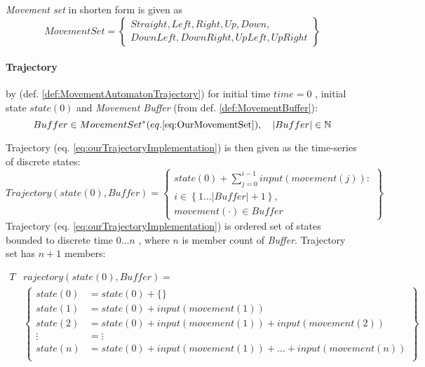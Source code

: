 \begin{note}
    \emph{Movement set} in shorten form is given as
    \begin{equation}\label{eq:OurMovementSet}
        Movement Set= \left\{
        \begin{gathered}
            Straight, Left,Right, Up, Down,\\
            Down Left, Down Right,  Up Left,   Up Right
        \end{gathered}
        \right\}
    \end{equation}
\end{note}

\paragraph{Trajectory} by (def. \ref{def:MovementAutomatonTrajectory}) for initial time $time = 0$ , initial state $state(0)$ and \emph{Movement Buffer} (from def. \ref{def:MovementBuffer}):
\begin{equation}\label{eq:ourBuffer}
    Buffer \in Movement Set^* (eq. \ref{eq:OurMovementSet}), \quad  |Buffer| \in \mathbb{N}
\end{equation}

Trajectory (eq. \ref{eq:ourTrajectoryImplementation}) is then given as the time-series of discrete states:
\begin{equation}\label{eq:ourTrajectoryImplementation}
    Trajectory(state(0),Buffer)= \left\{\begin{gathered}state(0)+\sum_{j=0}^{i-1} input(movement(j)):\\i \in\left\{1\dots |Buffer|+1\right\}, \\movement(\cdot) \in Buffer\end{gathered}\right\}
\end{equation}
\newpage
Trajectory (eq. \ref{eq:ourTrajectoryImplementation}) is ordered set of states bounded to discrete time $0\dots n$ , where $n$ is member count of \emph{Buffer}. Trajectory set has $n+1$ members:

\begin{equation}
    \begin{aligned}
    T&rajectory(state(0),Buffer)=\\
        &\left\{
        \begin{aligned}
            state(0) &= state(0) + \{\}\\
            state(1) &= state(0) + input(movement(1))\\
            state(2) &= state(0) + input(movement(1)) +input(movement(2))\\
             \vdots  &= \vdots\\
            state(n) &= state(0) + input(movement(1))+\dots+input(movement(n))\\
        \end{aligned}
        \right\}
    \end{aligned}
\end{equation}

